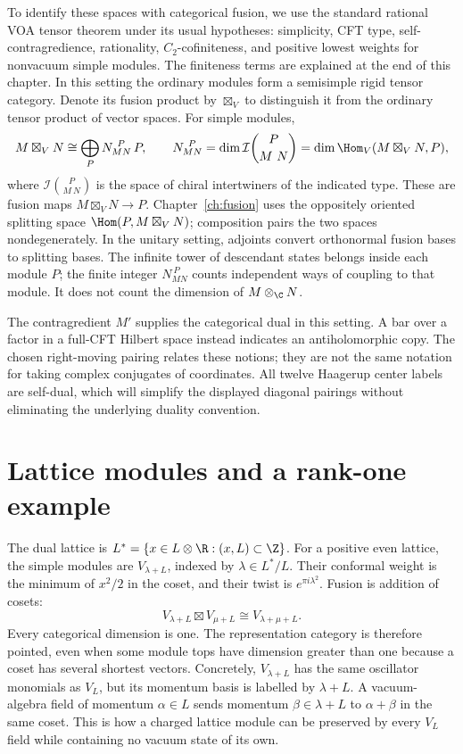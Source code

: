 To identify these spaces with categorical fusion, we use the standard
rational VOA tensor theorem under its usual hypotheses: simplicity,
CFT type, self-contragredience, rationality, $C_2$-cofiniteness, and
positive lowest weights for nonvacuum simple modules. The finiteness
terms are explained at the end of this chapter. In this setting the
ordinary modules form a semisimple rigid tensor category. Denote its
fusion product by $\boxtimes_V$ to distinguish it from the ordinary
tensor product of vector spaces. For simple modules,
\begin{equation}
 M\boxtimes_VN\cong\bigoplus_P N_{MN}^{\ P}\,P,
 \qquad
 N_{MN}^{\ P}
 =\dim\mathcal I\binom{P}{M\ N}
 =\dim\Hom_V(M\boxtimes_VN,P),
 \label{eq:voa-intertwiner-fusion}
\end{equation}
where $\mathcal I\binom{P}{M\ N}$ is the space of chiral
intertwiners of the indicated type. These are fusion maps
$M\boxtimes_VN\to P$. Chapter~\ref{ch:fusion} uses the oppositely
oriented splitting space $\Hom(P,M\boxtimes_VN)$; composition
pairs the two spaces nondegenerately. In the unitary setting,
adjoints convert orthonormal fusion bases to splitting bases.
The infinite tower of descendant
states belongs inside each module $P$; the finite integer
$N_{MN}^{\ P}$ counts independent ways of coupling to that module.
It does not count the dimension of $M\otimes_\C N$.

The contragredient $M'$ supplies the categorical dual in this setting.
A bar over a factor
in a full-CFT Hilbert space instead indicates an antiholomorphic copy.
The chosen right-moving pairing relates these notions; they are not
the same notation for taking complex conjugates of coordinates.
All twelve Haagerup center labels are self-dual, which will simplify
the displayed diagonal pairings without eliminating the underlying
duality convention.

\section{Lattice modules and a rank-one example}

The dual lattice is
$L^*=\{x\in L\otimes\R:(x,L)\subset\Z\}$.
For a positive even lattice, the simple modules are
$V_{\lambda+L}$, indexed by $\lambda\in L^*/L$. Their conformal
weight is the minimum of $x^2/2$ in the coset, and their twist is
$e^{\pi i\lambda^2}$. Fusion is addition of cosets:
\[
 V_{\lambda+L}\boxtimes V_{\mu+L}
 \cong V_{\lambda+\mu+L}.
\]
Every categorical dimension is one. The representation category is
therefore pointed, even when some module tops have dimension greater
than one because a coset has several shortest vectors.
Concretely, $V_{\lambda+L}$ has the same oscillator monomials as
$V_L$, but its momentum basis is labelled by $\lambda+L$.
A vacuum-algebra field of momentum $\alpha\in L$ sends momentum
$\beta\in\lambda+L$ to $\alpha+\beta$ in the same coset.
This is how a charged lattice module can be preserved by every
$V_L$ field while containing no vacuum state of its own.

